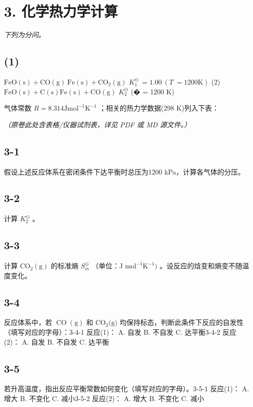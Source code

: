 \section*{3. 化学热力学计算}
\textit{下列为分问。}

\subsection*{(1)}
$\mathrm { F e O ( s ) + C O ( g )  \ F e ( s ) + C O _ { 2 } ( g ) }$ $K _ { 1 } ^ { \ominus } \ = 1 . 0 0 \ \left( T \ = 1 2 0 0 \mathrm { K } \right)$ (2) $\mathrm { F e O ( s ) } + \mathrm { C ( s ) }  \mathrm { F e ( s ) } + \mathrm { C O ( g ) }$ $K _ { 2 } ^ { \ominus }$ (� = 1200 K)

⽓体常数 $R = 8 . 3 1 4 \mathrm { J } \mathrm { m o l } ^ { - 1 } \mathrm { K } ^ { - 1 }$ ；相关的热⼒学数据(298 K)列⼊下表：

\textit{（原卷此处含表格/仪器试剂表，详见 PDF 或 MD 源文件。）}

\subsection*{3-1}
假设上述反应体系在密闭条件下达平衡时总压为1200 kPa，计算各⽓体的分压。

\subsection*{3-2}
计算 $K _ { 2 } ^ { \ominus }$ 。

\subsection*{3-3}
计算 $\mathrm { C O _ { 2 } ( g ) }$ 的标准熵 $S _ { m } ^ { \ominus }$ （单位：J $\mathrm { m o l ^ { - 1 } K ^ { - 1 } } )$ 。设反应的焓变和熵变不随温度变化。

\subsection*{3-4}
反应体系中，若 $\operatorname { C O } ( \mathrm { g } )$ 和 $\mathrm { C O } _ { 2 } ( \mathrm { g ) }$ 均保持标态，判断此条件下反应的⾃发性（填写对应的字⺟）：3-4-1 反应(1)： A. ⾃发 B. 不⾃发 C. 达平衡3-4-2 反应(2)： A. ⾃发 B. 不⾃发 C. 达平衡

\subsection*{3-5}
若升⾼温度，指出反应平衡常数如何变化（填写对应的字⺟）。3-5-1 反应(1)： A. 增⼤ B. 不变化 C. 减⼩3-5-2 反应(2)： A. 增⼤ B. 不变化 C. 减⼩
